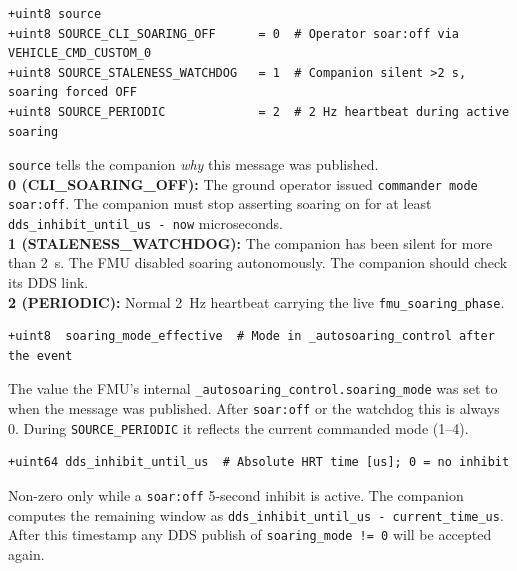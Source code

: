 \documentclass[12pt,a4paper]{article}
\begin{document}
\begin{lstlisting}[style=diff]
+uint8 source
+uint8 SOURCE_CLI_SOARING_OFF      = 0  # Operator soar:off via VEHICLE_CMD_CUSTOM_0
+uint8 SOURCE_STALENESS_WATCHDOG   = 1  # Companion silent >2 s, soaring forced OFF
+uint8 SOURCE_PERIODIC             = 2  # 2 Hz heartbeat during active soaring
\end{lstlisting}
\begin{annotation}\texttt{source} tells the companion \emph{why} this message was published.\\
\textbf{0 (CLI\_SOARING\_OFF):} The ground operator issued \texttt{commander mode soar:off}. The companion must stop asserting soaring on for at least \texttt{dds\_inhibit\_until\_us - now} microseconds.\\
\textbf{1 (STALENESS\_WATCHDOG):} The companion has been silent for more than 2~s. The FMU disabled soaring autonomously. The companion should check its DDS link.\\
\textbf{2 (PERIODIC):} Normal 2~Hz heartbeat carrying the live \texttt{fmu\_soaring\_phase}.\end{annotation}

\begin{lstlisting}[style=diff]
+uint8  soaring_mode_effective  # Mode in _autosoaring_control after the event
\end{lstlisting}
\begin{annotation}The value the FMU's internal \texttt{\_autosoaring\_control.soaring\_mode} was set to when the message was published. After \texttt{soar:off} or the watchdog this is always 0. During \texttt{SOURCE\_PERIODIC} it reflects the current commanded mode (1--4).\end{annotation}

\begin{lstlisting}[style=diff]
+uint64 dds_inhibit_until_us  # Absolute HRT time [us]; 0 = no inhibit
\end{lstlisting}
\begin{annotation}Non-zero only while a \texttt{soar:off} 5-second inhibit is active. The companion computes the remaining window as \texttt{dds\_inhibit\_until\_us - current\_time\_us}. After this timestamp any DDS publish of \texttt{soaring\_mode != 0} will be accepted again.\end{annotation}
\end{document}
